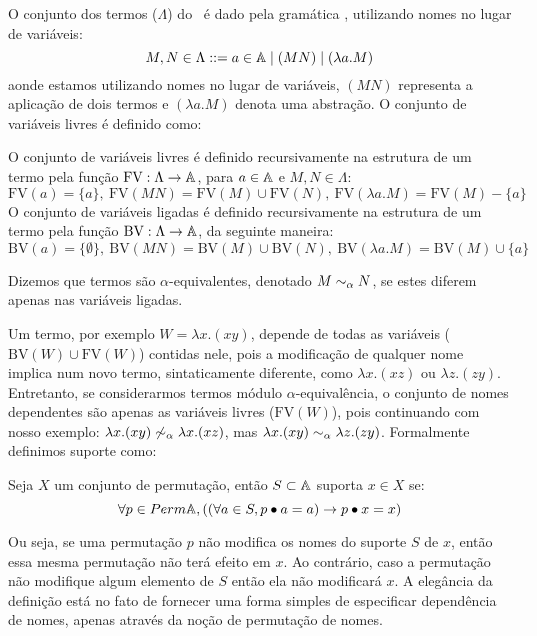 O conjunto dos termos ($\Lambda$) do \lcalc~é dado pela gramática \cite{Hindley2008}, utilizando nomes no lugar de variáveis:
\begin{equation}\label{eq:lambda}
	M, N \in \Lambda ::= a \in \mathbb{A} \mid (M N) \mid (\lambda a . M)
\end{equation}
aonde estamos utilizando nomes no lugar de variáveis, $(M N)$ representa a aplicação de dois termos e $(\lambda a . M)$ denota uma abstração. O conjunto de variáveis livres é definido como:
\begin{definicao}
	O conjunto de variáveis livres é definido recursivamente na estrutura de um termo pela função $\text{FV}: \Lambda \rightarrow \mathbb{A}$, para $a \in \mathbb{A}$ e $M, N \in \Lambda$:
	\begin{equation*}
		\text{FV}(a) = \{a\}, ~ \text{FV}(MN) = \text{FV}(M) \cup \text{FV}(N), ~
		\text{FV}(\lambda a . M) = \text{FV}(M) - \{a\}
	\end{equation*}
	O conjunto de variáveis ligadas é definido recursivamente na estrutura de um termo pela função $\text{BV}: \Lambda \rightarrow \mathbb{A}$, da seguinte maneira:
	\begin{equation*}
		\text{BV}(a) = \{\emptyset\}, ~ \text{BV}(MN) = \text{BV}(M) \cup \text{BV}(N), ~
		\text{BV}(\lambda a . M) = \text{BV}(M) \cup \{a\}
	\end{equation*}
\end{definicao}\noindent
Dizemos que termos são $\alpha$-equivalentes, denotado $M \sim_{\alpha} N$, se estes diferem apenas nas variáveis ligadas.

Um termo, por exemplo $W = \lambda x. (xy)$, depende de todas as variáveis ($\text{BV}(W) \cup \text{FV}(W)$) contidas nele, pois a modificação de qualquer nome implica num novo termo, sintaticamente diferente, como $\lambda x. (xz)$ ou $\lambda z. (zy)$. Entretanto, se considerarmos termos módulo $\alpha$-equivalência, o conjunto de nomes dependentes são apenas as variáveis livres ($\text{FV}(W)$), pois continuando com nosso exemplo: $\lambda x. (xy) \not\sim_{\alpha} \lambda x. (xz)$, mas $\lambda x. (xy) \sim_{\alpha} \lambda z. (zy)$. Formalmente definimos suporte como:
\begin{definicao}[Suporte]
	Seja $X$ um conjunto de permutação, então $S \subset \mathbb{A}$ suporta $x \in X$ se:
	\begin{equation}\label{eq:suporte}
		\forall p \in Perm \mathbb{A}, ((\forall a \in S, p \bullet a = a) \rightarrow p \bullet x = x)
	\end{equation}
\end{definicao}\noindent
Ou seja, se uma permutação $p$ não modifica os nomes do suporte $S$ de $x$, então essa mesma permutação não terá efeito em $x$. Ao contrário, caso a permutação não modifique algum elemento de $S$ então ela não modificará $x$. A elegância da definição está no fato de fornecer uma forma simples de especificar dependência de nomes, apenas através da noção de permutação de nomes.

